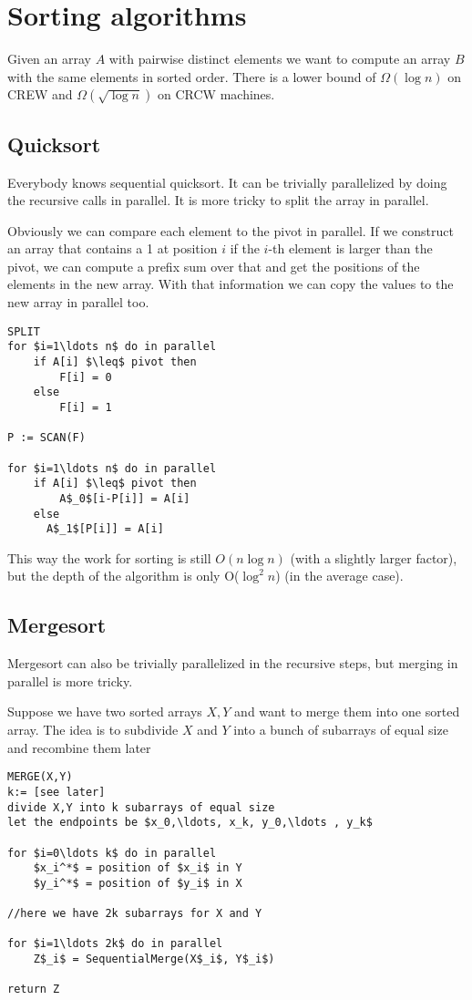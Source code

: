 \section{Sorting algorithms}

Given an array $A$ with pairwise distinct elements we want to compute an array $B$ with the same elements in sorted order. There is a lower bound of $\Omega(\log n)$ on CREW and $\Omega(\sqrt{\log n})$ on CRCW machines.

\subsection{Quicksort}

Everybody knows sequential quicksort. It can be trivially parallelized by doing the recursive calls in parallel. It is more tricky to split the array in parallel.

Obviously we can compare each element to the pivot in parallel. If we construct an array that contains a 1 at position $i$ if the $i$-th element is larger than the pivot, we can compute a prefix sum over that and get the positions of the elements in the new array. With that information we can copy the values to the new array in parallel too.

\begin{lstlisting}
SPLIT
for $i=1\ldots n$ do in parallel
	if A[i] $\leq$ pivot then
		F[i] = 0
	else
		F[i] = 1

P := SCAN(F)

for $i=1\ldots n$ do in parallel
	if A[i] $\leq$ pivot then
		A$_0$[i-P[i]] = A[i]
	else
	  A$_1$[P[i]] = A[i]
\end{lstlisting}

This way the work for sorting is still $O(n\log n)$ (with a slightly larger factor), but the depth of the algorithm is only O($\log^2 n$) (in the average case).

\subsection{Mergesort}

Mergesort can also be trivially parallelized in the recursive steps, but merging in parallel is more tricky.

Suppose we have two sorted arrays $X,Y$ and want to merge them into one sorted array. The idea is to subdivide $X$ and $Y$ into a bunch of subarrays of equal size and recombine them later

\begin{lstlisting}
MERGE(X,Y)
k:= [see later]
divide X,Y into k subarrays of equal size
let the endpoints be $x_0,\ldots, x_k, y_0,\ldots , y_k$

for $i=0\ldots k$ do in parallel
	$x_i^*$ = position of $x_i$ in Y
	$y_i^*$ = position of $y_i$ in X
	
//here we have 2k subarrays for X and Y

for $i=1\ldots 2k$ do in parallel
	Z$_i$ = SequentialMerge(X$_i$, Y$_i$)
	
return Z
\end{lstlisting}

